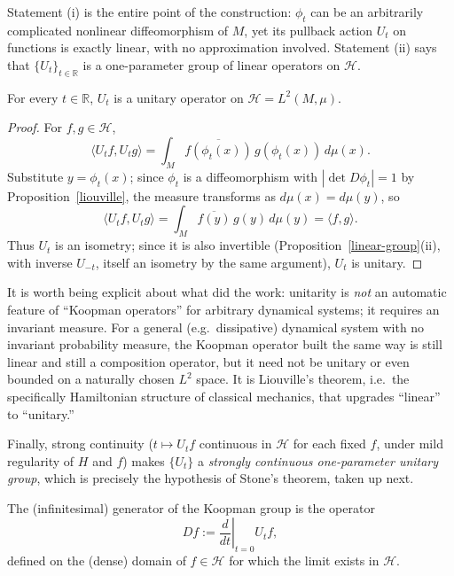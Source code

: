 Statement (i) is the entire point of the construction: $\phi_t$ can be an 
arbitrarily complicated nonlinear diffeomorphism of $M$, yet its pullback 
action $U_t$ on functions is exactly linear, with no approximation involved. 
Statement (ii) says that $\{U_t\}_{t\in\mathbb R}$ is a one-parameter group of linear 
operators on $\mathcal H$.

\begin{proposition}[Unitarity]
\label{unitary}
For every $t\in\mathbb R$, $U_t$ is a unitary operator on $\mathcal H=L^2(M,\mu)$.
\end{proposition}
\begin{proof}
For $f,g\in\mathcal H$,
\begin{equation}
\langle U_tf,U_tg\rangle = 
    \int_M \overline{f(\phi_t(x))}\,g(\phi_t(x))\,d\mu(x).
\end{equation}
Substitute $y=\phi_t(x)$; since $\phi_t$ is a diffeomorphism with 
    $\left|\det D\phi_t\right|=1$ by Proposition~\ref{liouville}, 
    the measure transforms as $d\mu(x)=d\mu(y)$, so
\begin{equation}
\langle U_tf,U_tg\rangle = \int_M \overline{f(y)}\,g(y)\,d\mu(y) =
    \langle f,g\rangle.
\end{equation}
Thus $U_t$ is an isometry; since it is also invertible 
    (Proposition~\ref{linear-group}(ii), with inverse $U_{-t}$, 
    itself an isometry by the same argument), $U_t$ is unitary.
\end{proof}

It is worth being explicit about what did the work: unitarity is \emph{not} an
automatic feature of ``Koopman operators'' for arbitrary dynamical systems; it
requires an invariant measure. For a general (e.g.\ dissipative) dynamical
system with no invariant probability measure, the Koopman operator built the
same way is still linear and still a composition operator, but it need not be
unitary or even bounded on a naturally chosen $L^2$ space. It is Liouville's
theorem, i.e.\ the specifically Hamiltonian structure of classical mechanics,
that upgrades ``linear'' to ``unitary.''

Finally, strong continuity ($t\mapsto U_tf$ continuous in $\mathcal H$ for each
fixed $f$, under mild regularity of $H$ and $f$) makes $\{U_t\}$ a
\emph{strongly continuous one-parameter unitary group}, which is precisely the
hypothesis of Stone's theorem, taken up next.

\begin{definition}[Generator]
The (infinitesimal) generator of the Koopman group is the operator
\begin{equation}
Df := \left.\frac{d}{d t}\right|_{t=0} U_tf,
\end{equation}
defined on the (dense) domain of $f\in\mathcal H$ for which the limit 
    exists in $\mathcal H$.
\end{definition}

